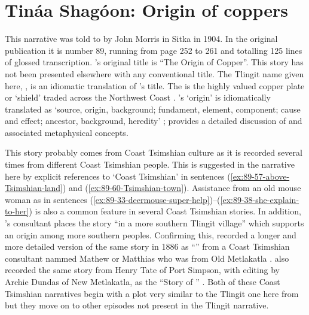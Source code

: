 
\resetexcnt
\chapter{Tináa Shagóon: Origin of coppers}\label{ch:89-origin-of-copper}

This narrative was told to \citeauthor{swanton:1909} by  John Morris in Sitka in 1904.
In the original publication it is number 89, running from page 252 to 261 and totalling 125 lines of glossed transcription.
\citeauthor{swanton:1909}’s original title is “The Origin of Copper”.
This story has not been presented elsewhere with any conventional title.
The Tlingit name given here, , is an idiomatic translation of \citeauthor{swanton:1909}’s title.
The  is the highly valued copper plate or ‘shield’ traded across the Northwest Coast \parencites{keithahn:1964}[353–354]{de-laguna:1972}{jopling:1989}[179–183]{emmons:1991}[237–243]{kan:2016}.
\citeauthor{swanton:1909}’s ‘origin’ is idiomatically translated as  ‘source, origin, background; fundament, element, component; cause and effect; ancestor, background, heredity’ \parencite[\textsc{t}·63]{leer:2001}; \textcite[71 ff.]{kan:2016} provides a detailed discussion of  and associated metaphysical concepts.

This story probably comes from Coast Tsimshian culture as it is recorded several times from different Coast Tsimshian people.
This is suggested in the narrative here by explicit references to  ‘Coast Tsimshian’ in sentences (\ref{ex:89-57-above-Tsimshian-land}) and (\ref{ex:89-60-Tsimshian-town}).
Assistance from an old mouse woman as in sentences (\ref{ex:89-33-deermouse-super-help})–(\ref{ex:89-38-she-explain-to-her}) is also a common feature in several Coast Tsimshian stories.
In addition, \citeauthor{emmons:1991}’s consultant places the story “in a more southern Tlingit village” which supports an origin among more southern peoples.
Confirming this, \citeauthor{boas:1895} recorded a longer and more detailed version of the same story in 1886 as “” \parencite[581–589]{boas:2002} from a Coast Tsimshian consultant nammed Mathew or Matthias who was from Old Metlakatla \parencites[69]{boas:1912a}[547]{boas:2002}.
\citeauthor{boas:1912a} also recorded the same story from Henry Tate of Port Simpson, with editing by Archie Dundas of New Metlakatla, as the “Story of ” \parencite[147–191]{boas:1912a}.
Both of these Coast Tsimshian narratives begin with a plot very similar to the Tlingit one here from  but they move on to other episodes not present in the Tlingit narrative.

